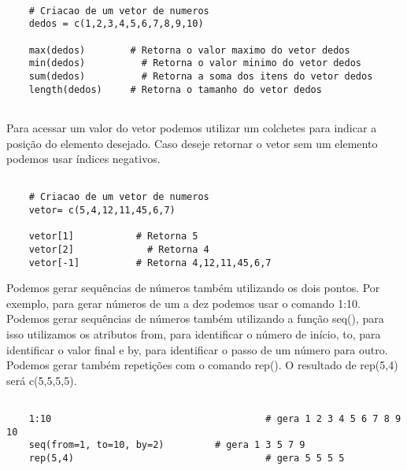 \begin{scriptsize}
	\estiloR
	\begin{lstlisting}[caption={Criação de um vetor em R}, label=lst:rcode]
	
	# Criacao de um vetor de numeros
	dedos = c(1,2,3,4,5,6,7,8,9,10)
	
	max(dedos)        # Retorna o valor maximo do vetor dedos
	min(dedos)		    # Retorna o valor minimo do vetor dedos
	sum(dedos)		    # Retorna a soma dos itens do vetor dedos
	length(dedos)     # Retorna o tamanho do vetor dedos
	
	\end{lstlisting}
\end{scriptsize}

Para acessar um valor do vetor podemos utilizar um colchetes para indicar a posição do elemento desejado. Caso deseje retornar o vetor sem um elemento podemos usar índices negativos.


\begin{scriptsize}
	\estiloR
	\begin{lstlisting}[caption={Criação de um vetor em R}, label=lst:rcode]
	
	# Criacao de um vetor de numeros
	vetor= c(5,4,12,11,45,6,7)
	
	vetor[1]           # Retorna 5
	vetor[2]    	     # Retorna 4
	vetor[-1]          # Retorna 4,12,11,45,6,7
	\end{lstlisting}
\end{scriptsize}

Podemos gerar sequências de números também utilizando os dois pontos. Por exemplo, para gerar números de um a dez podemos usar o comando 1:10. Podemos gerar sequências de números também utilizando a função seq(), para isso utilizamos os atributos from, para identificar o número de início, to, para identificar o valor final e by, para identificar o passo de um número para outro. Podemos gerar também repetições com o comando rep(). O resultado de rep(5,4) será c(5,5,5,5).

\begin{scriptsize}
	\estiloR
	\begin{lstlisting}[caption={Criação de um vetor em R}, label=lst:rcode]
	
	1:10 					                  # gera 1 2 3 4 5 6 7 8 9 10
	seq(from=1, to=10, by=2)         # gera 1 3 5 7 9
	rep(5,4)				                  # gera 5 5 5 5
	
	\end{lstlisting}
\end{scriptsize}

